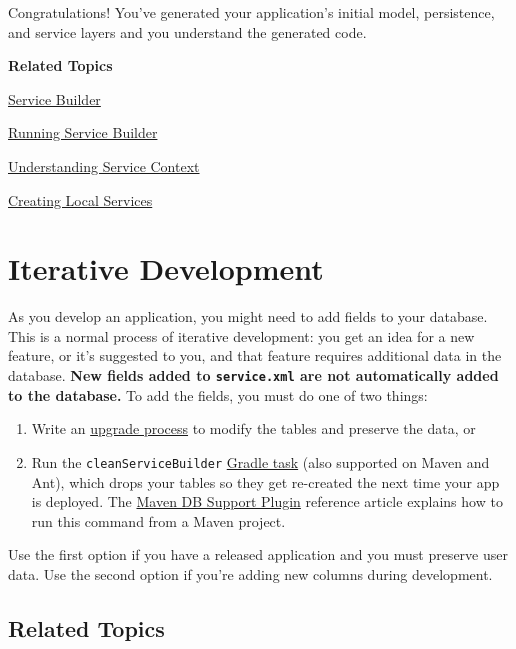 \noindent\hrulefill

Congratulations! You've generated your application's initial model,
persistence, and service layers and you understand the generated code.

\textbf{Related Topics}

\href{/docs/7-2/appdev/-/knowledge_base/a/service-builder}{Service
Builder}

\href{/docs/7-2/appdev/-/knowledge_base/a/running-service-builder}{Running
Service Builder}

\href{/docs/7-2/frameworks/-/knowledge_base/f/understanding-servicecontext}{Understanding
Service Context}

\href{/docs/7-2/appdev/-/knowledge_base/a/business-logic-with-service-builder}{Creating
Local Services}

\chapter{Iterative Development}\label{iterative-development}

As you develop an application, you might need to add fields to your
database. This is a normal process of iterative development: you get an
idea for a new feature, or it's suggested to you, and that feature
requires additional data in the database. \textbf{New fields added to
\texttt{service.xml} are not automatically added to the database.} To
add the fields, you must do one of two things:

\begin{enumerate}
\def\labelenumi{\arabic{enumi}.}
\item
  Write an
  \href{/docs/7-2/frameworks/-/knowledge_base/f/upgrade-processes}{upgrade
  process} to modify the tables and preserve the data, or
\item
  Run the \texttt{cleanServiceBuilder}
  \href{/docs/7-2/reference/-/knowledge_base/r/db-support-gradle-plugin}{Gradle
  task} (also supported on Maven and Ant), which drops your tables so
  they get re-created the next time your app is deployed. The
  \href{/docs/7-2/reference/-/knowledge_base/r/db-support-plugin}{Maven
  DB Support Plugin} reference article explains how to run this command
  from a Maven project.
\end{enumerate}

Use the first option if you have a released application and you must
preserve user data. Use the second option if you're adding new columns
during development.

\section{Related Topics}\label{related-topics-13}

